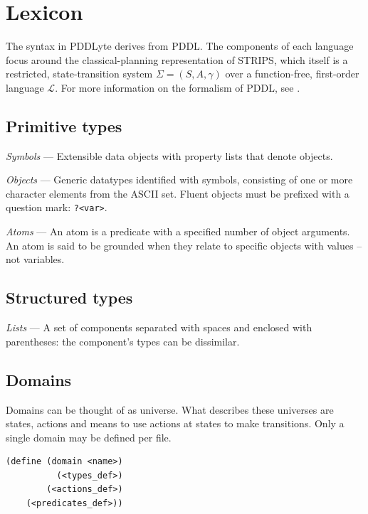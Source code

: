 \documentclass[
a4paper, %
11pt, %
onecolumn, %
openany, %
]{memoir}
\begin{document}
{\begin{center}
\begin{tikzpicture}[->,>=stealth']

\end{tikzpicture}
\end{center}


\section{Lexicon}

The syntax in PDDLyte derives from PDDL. The components of each language focus around the classical-planning representation of STRIPS, which itself is a restricted, state-transition system $\Sigma = (S,A,\gamma)$ over a function-free, first-order language $\mathcal{L}$. For more information on the formalism of PDDL, see \cite{auto_planning}.\\
\subsection{Primitive types}

\textit{Symbols} --- Extensible data objects with property lists that denote objects.

\textit{Objects} --- Generic datatypes identified with symbols, consisting of one or more character elements from the ASCII set. Fluent objects must be prefixed with a question mark: \texttt{?<var>}.

\textit{Atoms} --- An atom is a predicate with a specified number of object arguments. An atom is said to be grounded when they relate to specific objects with values -- not variables.

\subsection{Structured types}

\textit{Lists} --- A set of components separated with spaces and enclosed with parentheses: the component's types can be dissimilar.

\subsection{Domains} 
Domains can be thought of as universe. What describes these universes are states, actions and means to use actions at states to make transitions. Only a single domain may be defined per file. 

\begin{lstlisting}
(define (domain <name>)
          (<types_def>)
        (<actions_def>)
    (<predicates_def>))
\end{lstlisting}

}
\end{document}
